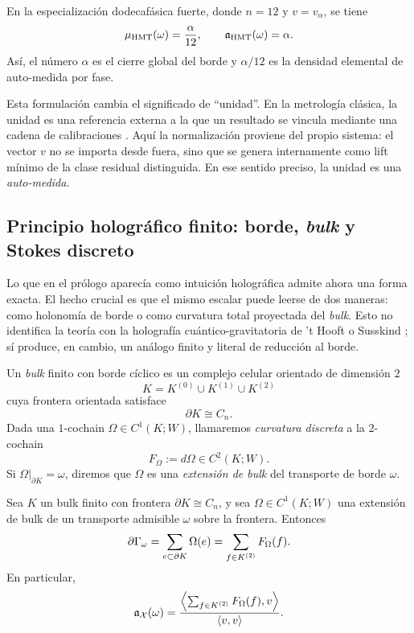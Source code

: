 \begin{corollary}\label{cor:self-measurement-hmt}
En la especialización dodecafásica fuerte, donde $n=12$ y $v=v_\alpha$, se tiene
\[
\mu_{\mathrm{HMT}}(\omega)=\frac{\alpha}{12},
\qquad
\mathfrak a_{\mathrm{HMT}}(\omega)=\alpha.
\]
Así, el número $\alpha$ es el cierre global del borde y $\alpha/12$ es la densidad elemental de
auto-medida por fase.
\end{corollary}

\begin{remark}
Esta formulación cambia el significado de ``unidad''. En la metrología clásica, la unidad es una
referencia externa a la que un resultado se vincula mediante una cadena de calibraciones
\cite{NISTTraceability2023,BIPMSI2019}. Aquí la normalización proviene del propio sistema: el
vector $v$ no se importa desde fuera, sino que se genera internamente como lift mínimo de la clase
residual distinguida. En ese sentido preciso, la unidad es una \emph{auto-medida}.
\end{remark}

\subsection{Principio holográfico finito: borde, \emph{bulk} y Stokes discreto}

Lo que en el prólogo aparecía como intuición holográfica admite ahora una forma exacta. El hecho
crucial es que el mismo escalar puede leerse de dos maneras: como holonomía de borde o como
curvatura total proyectada del \emph{bulk}. Esto no identifica la teoría con la holografía
cuántico-gravitatoria de 't Hooft o Susskind \cite{tHooft1993,Susskind1995}; sí produce, en cambio,
un análogo finito y literal de reducción al borde.

\begin{definition}
Un \emph{bulk} finito con borde cíclico es un complejo celular orientado de dimensión $2$
\[
K=K^{(0)}\cup K^{(1)}\cup K^{(2)}
\]
cuya frontera orientada satisface
\[
\partial K\cong C_n.
\]
Dada una $1$-cochain $\Omega\in C^1(K;W)$, llamaremos \emph{curvatura discreta} a la
$2$-cochain
\[
F_\Omega:=d\Omega\in C^2(K;W).
\]
Si $\Omega\vert_{\partial K}=\omega$, diremos que $\Omega$ es una \emph{extensión de bulk} del
transporte de borde $\omega$.
\end{definition}

\begin{theorem}\label{thm:discrete-stokes-projected}
Sea $K$ un bulk finito con frontera $\partial K\cong C_n$, y sea $\Omega\in C^1(K;W)$ una
extensión de bulk de un transporte admisible $\omega$ sobre la frontera. Entonces
\[
\partial\Gamma_\omega
=
\sum_{e\subset \partial K}\Omega(e)
=
\sum_{f\in K^{(2)}}F_\Omega(f).
\]
En particular,
\[
\mathfrak a_\mathcal X(\omega)
=
\frac{\left\langle \sum_{f\in K^{(2)}}F_\Omega(f),v\right\rangle}{\langle v,v\rangle}.
\]
\end{theorem}

